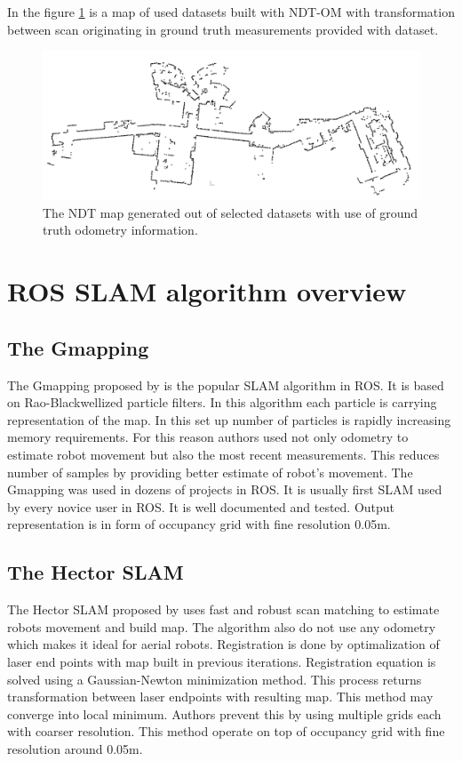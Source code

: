 In the figure \ref{fig:ground_truth} is a map of used datasets built with \gls{NDT-OM} with transformation between scan originating in ground truth measurements provided with dataset. 

\begin{figure}
	\centering
	\includegraphics[width=140mm]{../img/ground_truth.png}
	\caption{The \gls{NDT} map generated out of selected datasets with use of ground truth odometry information.}\label{fig:ground_truth}
\end{figure}
  
\section{ROS SLAM algorithm overview}
\subsection{The Gmapping}
The Gmapping proposed by \cite{gmapping} is the popular \gls{SLAM} algorithm in \gls{ROS}. It is based on Rao-Blackwellized particle filters. In this algorithm each particle is carrying representation of the map. In this set up number of particles is rapidly increasing memory requirements. For this reason authors used not only odometry to estimate robot movement but also the most recent measurements. This reduces number of samples by providing better estimate of robot's movement. The Gmapping was used in dozens of projects in ROS. It is usually first \gls{SLAM} used by every novice user in \gls{ROS}. It is well documented and tested. Output representation is in form of occupancy grid with fine resolution 0.05m. 
\subsection{The Hector SLAM}
The Hector \gls{SLAM}  proposed by \cite{Hector} uses fast and robust scan matching to estimate robots movement and build map. The algorithm also do not use any odometry which makes it ideal for aerial robots. Registration is done by optimalization of laser end points with map built in previous iterations. Registration equation is solved using a Gaussian-Newton minimization method. This process returns transformation between laser endpoints with resulting map. This method may converge into local minimum. Authors prevent this by using multiple grids each with coarser resolution. This method operate on top of occupancy grid with fine resolution around 0.05m.

